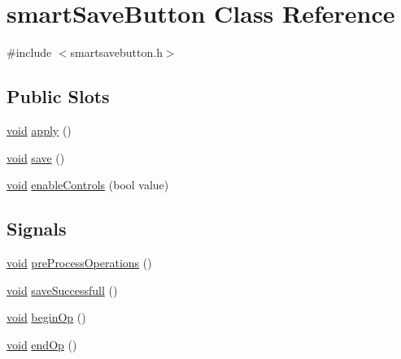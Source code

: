\hypertarget{classsmart_save_button}{\section{smart\-Save\-Button \-Class \-Reference}
\label{classsmart_save_button}
}


{\ttfamily \#include $<$smartsavebutton.\-h$>$}

\subsection*{\-Public \-Slots}
\begin{DoxyCompactItemize}
\item 
\hyperlink{group___u_a_v_objects_plugin_ga444cf2ff3f0ecbe028adce838d373f5c}{void} \hyperlink{group___u_a_v_object_widget_utils_ga453b1bbd8b56fa6af4f362b00221b265}{apply} ()
\item 
\hyperlink{group___u_a_v_objects_plugin_ga444cf2ff3f0ecbe028adce838d373f5c}{void} \hyperlink{group___u_a_v_object_widget_utils_gad0e6541ace97075634254ba3b1cc9bf9}{save} ()
\item 
\hyperlink{group___u_a_v_objects_plugin_ga444cf2ff3f0ecbe028adce838d373f5c}{void} \hyperlink{group___u_a_v_object_widget_utils_ga56d88dfdb1b735dbaf2c957e32fca452}{enable\-Controls} (bool value)
\end{DoxyCompactItemize}
\subsection*{\-Signals}
\begin{DoxyCompactItemize}
\item 
\hyperlink{group___u_a_v_objects_plugin_ga444cf2ff3f0ecbe028adce838d373f5c}{void} \hyperlink{group___u_a_v_object_widget_utils_ga986b48d4e0086adbba03b2da6178524b}{pre\-Process\-Operations} ()
\item 
\hyperlink{group___u_a_v_objects_plugin_ga444cf2ff3f0ecbe028adce838d373f5c}{void} \hyperlink{group___u_a_v_object_widget_utils_gafe5d25f2387fdd74204dec872a062f3e}{save\-Successfull} ()
\item 
\hyperlink{group___u_a_v_objects_plugin_ga444cf2ff3f0ecbe028adce838d373f5c}{void} \hyperlink{group___u_a_v_object_widget_utils_ga84a531cfeea77f9e892321017dbcd705}{begin\-Op} ()
\item 
\hyperlink{group___u_a_v_objects_plugin_ga444cf2ff3f0ecbe028adce838d373f5c}{void} \hyperlink{group___u_a_v_object_widget_utils_ga2e135b9ad9a743cd1b8b358069ffaf3e}{end\-Op} ()
\end{DoxyCompactItemize}
